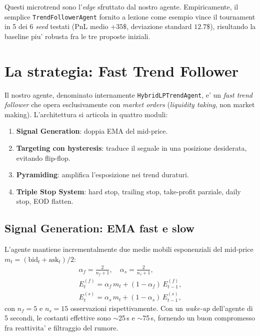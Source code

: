 \documentclass[11pt,a4paper]{article}
\begin{document}
Questi microtrend sono l'\emph{edge} sfruttato dal nostro agente.
Empiricamente, il semplice \texttt{TrendFollowerAgent} fornito a
lezione come esempio vince il tournament in 5 dei 6 \emph{seed}
testati (PnL medio $+35\$$, deviazione standard $12.7\$$),
risultando la baseline piu' robusta fra le tre proposte iniziali.

\section{La strategia: Fast Trend Follower}
\label{sec:strategy}

Il nostro agente, denominato internamente
\texttt{HybridLPTrendAgent}, e' un \emph{fast trend follower} che
opera esclusivamente con \emph{market orders} (\emph{liquidity
taking}, non market making).  L'architettura si articola in quattro
moduli:

\begin{enumerate}
    \item \textbf{Signal Generation}: doppia EMA del mid-price.
    \item \textbf{Targeting con hysteresis}: traduce il segnale
          in una posizione desiderata, evitando flip-flop.
    \item \textbf{Pyramiding}: amplifica l'esposizione nei trend
          duraturi.
    \item \textbf{Triple Stop System}: hard stop, trailing stop,
          take-profit parziale, daily stop, EOD flatten.
\end{enumerate}

\subsection{Signal Generation: EMA fast e slow}

L'agente mantiene incrementalmente due medie mobili esponenziali del
mid-price $m_t = (\text{bid}_t + \text{ask}_t)/2$:
\begin{align}
    \alpha_f = \frac{2}{n_f+1}, \quad
    \alpha_s = \frac{2}{n_s+1}, \\
    E^{(f)}_t = \alpha_f\,m_t + (1-\alpha_f)\,E^{(f)}_{t-1},
    \label{eq:emafast}\\
    E^{(s)}_t = \alpha_s\,m_t + (1-\alpha_s)\,E^{(s)}_{t-1},
    \label{eq:emaslow}
\end{align}
con $n_f = 5$ e $n_s = 15$ osservazioni rispettivamente.  Con un
\emph{wake-up} dell'agente di 5 secondi, le costanti effettive sono
$\sim$25\,s e $\sim$75\,s, fornendo un buon compromesso fra
reattivita' e filtraggio del rumore.
\end{document}
